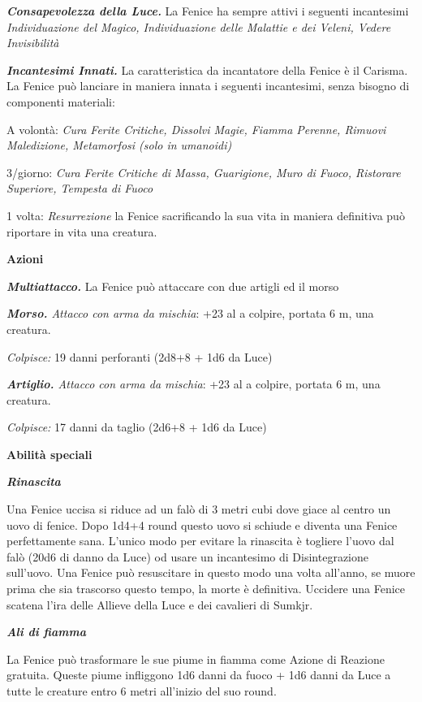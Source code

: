 \begin{multicols}{2}
	\textit{\textbf{Consapevolezza della Luce.}} La Fenice ha sempre attivi i seguenti incantesimi \textit{Individuazione del Magico, Individuazione delle Malattie e dei Veleni, Vedere Invisibilità}

	\textit{\textbf{Incantesimi Innati.}} La caratteristica da incantatore della Fenice è il Carisma. La Fenice può lanciare in maniera innata i seguenti incantesimi, senza bisogno di componenti materiali:

	A volontà: \textit{Cura Ferite Critiche, Dissolvi Magie, Fiamma Perenne, Rimuovi Maledizione, Metamorfosi (solo in umanoidi)}

	3/giorno: \textit{Cura Ferite Critiche di Massa, Guarigione, Muro di Fuoco, Ristorare Superiore, Tempesta di Fuoco}

	1 volta: \textit{Resurrezione} la Fenice sacrificando la sua vita in maniera definitiva può riportare in vita una creatura.

	\textbf{Azioni}

	\textit{\textbf{Multiattacco.}} La Fenice può attaccare con due artigli ed il morso

	\textit{\textbf{Morso.} Attacco con arma da mischia}: +23 al a colpire, portata 6 m, una creatura.

	\textit{Colpisce:} 19 danni perforanti (2d8+8 + 1d6 da Luce)

	\textit{\textbf{Artiglio.} Attacco con arma da mischia}: +23 al a colpire, portata 6 m, una creatura.

	\textit{Colpisce:} 17 danni da taglio (2d6+8 + 1d6 da Luce)

	\textbf{Abilità speciali}

	\textit{\textbf{Rinascita}}

	Una Fenice uccisa si riduce ad un falò di 3 metri cubi dove giace al centro un uovo di fenice. Dopo 1d4+4 round questo uovo si schiude e diventa una Fenice perfettamente sana. L'unico modo per evitare la rinascita è togliere l'uovo dal falò (20d6 di danno da Luce) od usare un incantesimo di Disintegrazione sull'uovo.
	Una Fenice può resuscitare in questo modo una volta all’anno, se muore prima che sia trascorso questo tempo, la morte è definitiva. Uccidere una Fenice scatena l'ira delle Allieve della Luce e dei cavalieri di Sumkjr.

	\textit{\textbf{Ali di fiamma}}

	La Fenice può trasformare le sue piume in fiamma come Azione di Reazione gratuita. Queste piume infliggono 1d6 danni da fuoco + 1d6 danni da Luce a tutte le creature entro 6 metri all’inizio del suo round.


\end{multicols}
